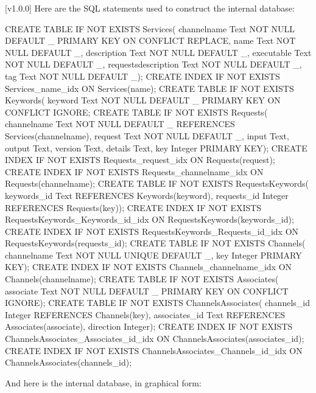 [v1.0.0]
%
Here are the SQL statements used to construct the internal database:
\outputBegin{}
\begin{listing}[5]{1}
CREATE TABLE IF NOT EXISTS Services(
       channelname Text NOT NULL DEFAULT _{} PRIMARY KEY ON CONFLICT REPLACE,
       name Text NOT NULL DEFAULT _,
       description Text NOT NULL DEFAULT _,
       executable Text NOT NULL DEFAULT _,
       requestsdescription Text NOT NULL DEFAULT _,
       tag Text NOT NULL DEFAULT  _);
CREATE INDEX IF NOT EXISTS Services_name_idx ON Services(name);
CREATE TABLE IF NOT EXISTS Keywords(
       keyword Text NOT NULL DEFAULT _{} PRIMARY KEY ON CONFLICT IGNORE;
CREATE TABLE IF NOT EXISTS Requests(
       channelname Text NOT NULL DEFAULT _{} REFERENCES Services(channelname),
       request Text NOT NULL DEFAULT _,
       input Text,
       output Text,
       version Text,
       details Text,
       key Integer PRIMARY KEY);
CREATE INDEX IF NOT EXISTS Requests_request_idx ON Requests(request);
CREATE INDEX IF NOT EXISTS Requests_channelname_idx ON Requests(channelname);
CREATE TABLE IF NOT EXISTS RequestsKeywords(
       keywords_id Text REFERENCES Keywords(keyword),
       requests_id Integer REFERENCES Requests(key));
CREATE INDEX IF NOT EXISTS RequestsKeywords_Keywords_id_idx ON
       RequestsKeywords(keywords_id);
CREATE INDEX IF NOT EXISTS RequestsKeywords_Requests_id_idx ON
       RequestsKeywords(requests_id);
CREATE TABLE IF NOT EXISTS Channels(
       channelname Text NOT NULL UNIQUE DEFAULT _,
       key Integer PRIMARY KEY);
CREATE INDEX IF NOT EXISTS Channels_channelname_idx ON Channels(channelname);
CREATE TABLE IF NOT EXISTS Associates(
       associate Text NOT NULL DEFAULT _{} PRIMARY KEY ON CONFLICT IGNORE);
CREATE TABLE IF NOT EXISTS ChannelsAssociates(
       channels_id Integer REFERENCES Channels(key),
       associates_id Text REFERENCES Associates(associate),
       direction Integer);
CREATE INDEX IF NOT EXISTS ChannelsAssociates_Associates_id_idx ON
       ChannelsAssociates(associates_id);
CREATE INDEX IF NOT EXISTS ChannelsAssociates_Channels_id_idx ON
       ChannelsAssociates(channels_id);
\end{listing}
\outputEnd{}
\condPage{}
And here is the internal database, in graphical form:\\
\appendixEnd{}
